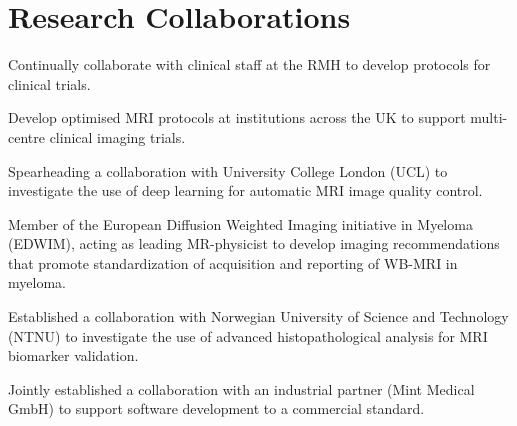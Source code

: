 \documentclass[]{mbcv}
\begin{document}
{\section{Research Collaborations}
\vspace*{10pt}
\begin{tightemize}
\item Continually collaborate with clinical staff at the RMH to develop protocols for clinical trials.
\item Develop optimised MRI protocols at institutions across the UK to support multi-centre clinical imaging trials.
\item Spearheading a collaboration with University College London (UCL) to investigate the use of deep learning for automatic MRI image quality control.
\item Member of the European Diffusion Weighted Imaging initiative in Myeloma (EDWIM), acting as leading MR-physicist to develop imaging recommendations that promote standardization of acquisition and reporting of WB-MRI in myeloma.
\item Established a collaboration with Norwegian University of Science and Technology (NTNU) to investigate the use of advanced histopathological analysis for MRI biomarker validation.
\item Jointly established a collaboration with an industrial partner (Mint Medical GmbH) to support software development to a commercial standard.
\end{tightemize}

\newpage

}
\end{document}
